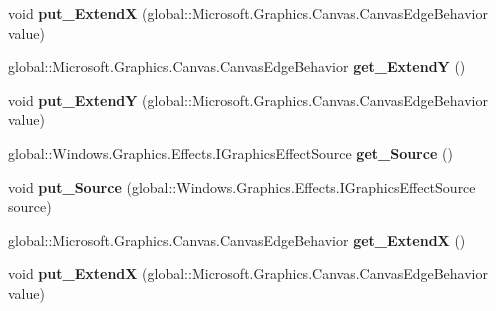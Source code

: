 \begin{DoxyCompactItemize}
void {\bfseries put\+\_\+\+ExtendX} (global\+::\+Microsoft.\+Graphics.\+Canvas.\+Canvas\+Edge\+Behavior value)
\item 
\mbox{\label{interface_microsoft_1_1_graphics_1_1_canvas_1_1_effects_1_1_i_border_effect_a7a0f2391a20f1cfa52255948727851d6}} 
global\+::\+Microsoft.\+Graphics.\+Canvas.\+Canvas\+Edge\+Behavior {\bfseries get\+\_\+\+ExtendY} ()
\item 
\mbox{\label{interface_microsoft_1_1_graphics_1_1_canvas_1_1_effects_1_1_i_border_effect_a372972f65ae9a42601613acb61241a6d}} 
void {\bfseries put\+\_\+\+ExtendY} (global\+::\+Microsoft.\+Graphics.\+Canvas.\+Canvas\+Edge\+Behavior value)
\item 
\mbox{\label{interface_microsoft_1_1_graphics_1_1_canvas_1_1_effects_1_1_i_border_effect_a2455f124b6e073f2b70aa6c68d5bc616}} 
global\+::\+Windows.\+Graphics.\+Effects.\+I\+Graphics\+Effect\+Source {\bfseries get\+\_\+\+Source} ()
\item 
\mbox{\label{interface_microsoft_1_1_graphics_1_1_canvas_1_1_effects_1_1_i_border_effect_a7d1e465d73b86e93f93e8df97f29f492}} 
void {\bfseries put\+\_\+\+Source} (global\+::\+Windows.\+Graphics.\+Effects.\+I\+Graphics\+Effect\+Source source)
\item 
\mbox{\label{interface_microsoft_1_1_graphics_1_1_canvas_1_1_effects_1_1_i_border_effect_a3ffc4033dcf6efc380e3123b9b5c0705}} 
global\+::\+Microsoft.\+Graphics.\+Canvas.\+Canvas\+Edge\+Behavior {\bfseries get\+\_\+\+ExtendX} ()
\item 
\mbox{\label{interface_microsoft_1_1_graphics_1_1_canvas_1_1_effects_1_1_i_border_effect_a3d2ad4061338958f9b6396932807d34e}} 
void {\bfseries put\+\_\+\+ExtendX} (global\+::\+Microsoft.\+Graphics.\+Canvas.\+Canvas\+Edge\+Behavior value)
\item 
\mbox{\label{interface_microsoft_1_1_graphics_1_1_canvas_1_1_effects_1_1_i_border_effect_a7a0f2391a20f1cfa52255948727851d6}} 

\end{DoxyCompactItemize}
